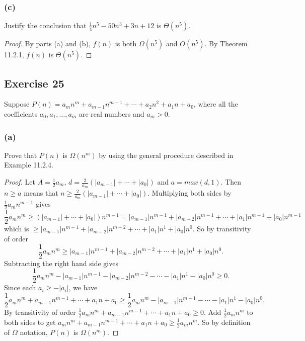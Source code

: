 \documentclass[14pt]{extarticle}
\newcommand{\dps}{\displaystyle}
\begin{document}
\subsubsection{(c)}
Justify the conclusion that \(\frac{1}{4}n^5 - 50n^3 + 3n + 12\) is \(\Theta(n^5)\).

\begin{proof}
    By parts (a) and (b), \(f(n)\) is both \(\Omega(n^5)\) and \(O(n^5)\). By Theorem 11.2.1, \(f(n)\) is \(\Theta(n^5)\).
\end{proof}

\subsection{Exercise 25}
Suppose \(P(n) = a_mn^m + a_{m-1}n^{m-1} + \cdots + a_2n^2 + a_1n + a_0\), where all the coefficients \(a_0, a_1, \ldots,
a_m\) are real numbers and \(a_m > 0\).

\subsubsection{(a)}
Prove that \(P(n)\) is \(\Omega(n^m)\) by using the general procedure described in Example 11.2.4.

\begin{proof}
    Let \(\dps A = \frac{1}{2}a_m\), \(\dps d = \frac{2}{a_m}(|a_{m-1}| + \cdots + |a_0|)\) and \(a = max(d, 1)\). Then
    \(n \geq a\) means that \(\dps n \geq \frac{2}{a_m}(|a_{m-1}| + \cdots + |a_0|)\). Multiplying both sides by \(\dps
    \frac{1}{2}a_m n^{m-1}\) gives
    \[
        \frac{1}{2}a_m n^m \geq (|a_{m-1}| + \cdots + |a_0|)n^{m-1} = |a_{m-1}|n^{m-1} + |a_{m-2}|n^{m-1} + \cdots + |a_1|n^{m-1} +
        |a_0|n^{m-1}
    \]
    which is \(\geq |a_{m-1}|n^{m-1} + |a_{m-2}|n^{m-2} + \cdots + |a_1|n^1 + |a_0|n^0\). So by transitivity of order
    \[
        \frac{1}{2}a_m n^m \geq |a_{m-1}|n^{m-1} + |a_{m-2}|n^{m-2} + \cdots + |a_1|n^1 + |a_0|n^0.
    \]
    Subtracting the right hand side gives
    \[
        \frac{1}{2}a_m n^m - |a_{m-1}|n^{m-1} - |a_{m-2}|n^{m-2} - \cdots - |a_1|n^1 - |a_0|n^0 \geq 0.
    \]
    Since each \(a_i \geq -|a_i|\), we have
    \[
        \frac{1}{2}a_m n^m + a_{m-1}n^{m-1} + \cdots + a_1n + a_0 \geq \frac{1}{2}a_m n^m - |a_{m-1}|n^{m-1} - \cdots - |a_1|n^1 -
        |a_0|n^0.
    \]
    By transitivity of order \(\frac{1}{2}a_m n^m + a_{m-1}n^{m-1} + \cdots + a_1n + a_0 \geq 0\). Add \(\frac{1}{2}a_mn^m\) to
    both sides to get \(a_m n^m + a_{m-1}n^{m-1} + \cdots + a_1n + a_0 \geq \frac{1}{2}a_mn^m\). So by definition of \(\Omega\)
    notation, \(P(n)\) is \(\Omega(n^m)\).
\end{proof}
\end{document}
